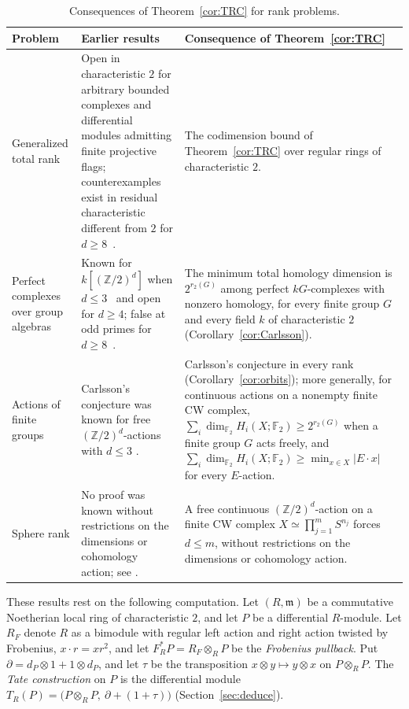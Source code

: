 \documentclass[11pt,reqno]{amsart}
\theoremstyle{plain}
\theoremstyle{definition}
\newcommand{\Ff}{\mathbb{F}}
\newcommand{\Z}{\mathbb{Z}}
\newcommand{\Tate}{T}                 %
\newcommand{\Frob}{F_R^{*}}           %
\newcommand{\Rone}{R_F}               %
\begin{document}
\begin{table}[t]
\caption{Consequences of Theorem~\ref{cor:TRC} for rank problems.}
\label{tab:rank-status}
\centering
\footnotesize
\setlength{\tabcolsep}{4pt}
\renewcommand{\arraystretch}{1.14}
\begin{tabularx}{\textwidth}{
 @{}>{\raggedright\arraybackslash}p{}
 >{\raggedright\arraybackslash}X
 >{\raggedright\arraybackslash}X@{}}
\toprule
Problem & Earlier results & Consequence of Theorem~\ref{cor:TRC} \\
\midrule
Generalized total rank
& Open in characteristic $2$ for arbitrary bounded complexes and differential modules admitting
finite projective flags;
counterexamples exist in residual characteristic different from $2$ for $d\ge8$~\cite{IyengarWalker}.
& The codimension bound of Theorem~\ref{cor:TRC} over regular rings of characteristic $2$. \\
\addlinespace[2pt]
Perfect complexes over group algebras
& Known for $k[(\Z/2)^d]$ when $d\le3$~\cite[Theorem~2]{CarlssonStudies} and open for $d\ge4$;
false at odd primes for $d\ge8$~\cite{IyengarWalker}.
& The minimum total homology dimension is $2^{r_2(G)}$ among perfect $kG$-complexes with nonzero
homology, for every finite group $G$ and every field $k$ of characteristic $2$
(Corollary~\ref{cor:Carlsson}). \\
\addlinespace[2pt]
Actions of finite groups
& Carlsson's conjecture was known for free $(\Z/2)^d$-actions with $d\le3$
\cite[Theorem~2]{CarlssonStudies}.
& Carlsson's conjecture in every rank (Corollary~\ref{cor:orbits}); more generally, for continuous
actions on a nonempty finite CW complex,
$\sum_i\dim_{\Ff_2}H_i(X;\Ff_2)\ge2^{r_2(G)}$ when a finite group $G$ acts freely, and
$\sum_i\dim_{\Ff_2}H_i(X;\Ff_2)\ge\min_{x\in X}|E\cdot x|$ for every $E$-action. \\
\addlinespace[2pt]
Sphere rank
& No proof was known without restrictions on the dimensions or cohomology action; see
\cite{CarlssonSpheres,CarlssonSphereRank,AdemBrowder,Hanke,OkutanYalcin}.
& A free continuous $(\Z/2)^d$-action on a finite CW complex
$X\simeq\prod_{j=1}^mS^{n_j}$ forces $d\le m$, without restrictions on the dimensions or
cohomology action. \\
\bottomrule
\end{tabularx}
\end{table}

These results rest on the following computation.  Let $(R,\mathfrak m)$ be a commutative Noetherian
local ring of characteristic $2$, and let $P$ be a differential $R$-module.  Let $\Rone$ denote
$R$ as a bimodule with regular left action and
right action twisted by Frobenius, $x\cdot r=xr^2$, and let $\Frob P=\Rone\otimes_R P$ be the
\emph{Frobenius pullback}.  Put $\partial=d_P\otimes1+1\otimes d_P$, and let $\tau$ be the
transposition $x\otimes y\mapsto y\otimes x$ on $P\otimes_R P$.  The \emph{Tate construction} on $P$
is the differential module $\Tate_R(P)=\bigl(P\otimes_RP,\ \partial+(1+\tau)\bigr)$
(Section~\ref{sec:deduce}).
\end{document}
